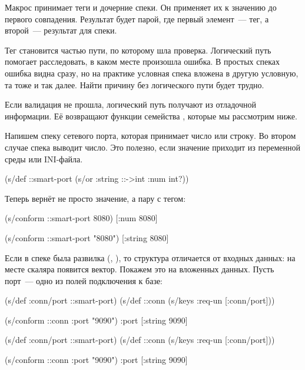 Макрос  принимает теги и дочерние спеки. Он применяет их к значению
до первого совпадения. Результат будет парой, где первый элемент~--- тег, а
второй~--- результат  для спеки.

Тег становится частью пути, по которому шла проверка. Логический путь помогает
расследовать, в каком месте произошла ошибка. В простых спеках ошибка видна
сразу, но на практике условная спека вложена в другую условную, та тоже и так
далее. Найти причину без логического пути будет трудно.


Если валидация не прошла, логический путь получают из отладочной информации. Её
возвращают функции семейства , которые мы рассмотрим ниже.

Напишем спеку сетевого порта, которая принимает число или строку. Во втором
случае спека выводит число. Это полезно, если значение приходит из переменной
среды или INI-файла.

\begin{clojure}
(s/def ::smart-port
  (s/or :string ::->int :num int?))
\end{clojure}

\noindent
Теперь  вернёт не просто значение, а пару с тегом:

\begin{clojure}
(s/conform ::smart-port 8080)
[:num 8080]

(s/conform ::smart-port "8080")
[:string 8080]
\end{clojure}


Если в спеке была развилка (, ), то структура
 отличается от входных данных: на месте скаляра появится
вектор. Покажем это на вложенных данных. Пусть порт~--- одно из полей
подключения к базе:

\ifafive

\begin{clojure}
(s/def :conn/port ::smart-port)
(s/def ::conn
  (s/keys :req-un [:conn/port]))
\end{clojure}

\pagebreak

\begin{clojure}
(s/conform ::conn {:port "9090"})
{:port [:string 9090]}
\end{clojure}

\else

\begin{clojure}
(s/def :conn/port ::smart-port)
(s/def ::conn
  (s/keys :req-un [:conn/port]))

(s/conform ::conn {:port "9090"})
{:port [:string 9090]}
\end{clojure}

